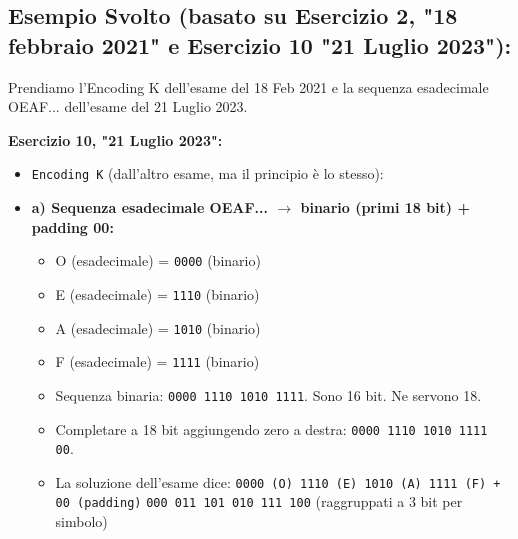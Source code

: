 \subsection{Esempio Svolto (basato su Esercizio 2, "18 febbraio 2021" e Esercizio 10 "21 Luglio 2023"):}
Prendiamo l'Encoding K dell'esame del 18 Feb 2021 e la sequenza esadecimale OEAF... dell'esame del 21 Luglio 2023.

\textbf{Esercizio 10, "21 Luglio 2023":}
\begin{itemize}
    \item \texttt{Encoding K} (dall'altro esame, ma il principio è lo stesso):
    \item \textbf{a) Sequenza esadecimale OEAF... $\to$ binario (primi 18 bit) + padding 00:}
    \begin{itemize}
        \item O (esadecimale) = \texttt{0000} (binario)
        \item E (esadecimale) = \texttt{1110} (binario)
        \item A (esadecimale) = \texttt{1010} (binario)
        \item F (esadecimale) = \texttt{1111} (binario)
        \item Sequenza binaria: \texttt{0000 1110 1010 1111}. Sono 16 bit. Ne servono 18.
        \item Completare a 18 bit aggiungendo zero a destra: \texttt{0000 1110 1010 1111 00}.
        \item La soluzione dell'esame dice: \texttt{0000 (O) 1110 (E) 1010 (A) 1111 (F) + 00 (padding)}
        \texttt{000 011 101 010 111 100} (raggruppati a 3 bit per simbolo)

\end{itemize}
\end{itemize}
